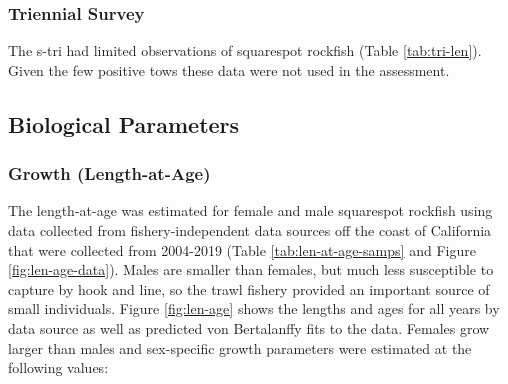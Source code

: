 \documentclass[11pt,
  english,
  a4paper,
]{article}
\begin{document}
\leavevmode\tagmcend\tagstructend\par


\hypertarget{triennial-survey}{%
\subsubsection{Triennial Survey}\label{triennial-survey}}

\leavevmode\tagmcend\tagstructend


The \gls{s-tri} had limited observations of squarespot rockfish (Table \ref{tab:tri-len}). Given the few positive tows these data were not used in the assessment.

\leavevmode\tagmcend\tagstructend\par


\hypertarget{biological-parameters}{%
\subsection{Biological Parameters}\label{biological-parameters}}

\leavevmode\tagmcend\tagstructend


\hypertarget{growth-length-at-age}{%
\subsubsection{Growth (Length-at-Age)}\label{growth-length-at-age}}

\leavevmode\tagmcend\tagstructend


The length-at-age was estimated for female and male squarespot rockfish using data collected from fishery-independent data sources off the coast of California that were collected from 2004-2019 (Table \ref{tab:len-at-age-samps} and Figure \ref{fig:len-age-data}). Males are smaller than females, but much less susceptible to capture by hook and line, so the trawl fishery provided an important source of small individuals. Figure \ref{fig:len-age} shows the lengths and ages for all years by data source as well as predicted von Bertalanffy fits to the data. Females grow larger than males and sex-specific growth parameters were estimated at the following values:
\end{document}
